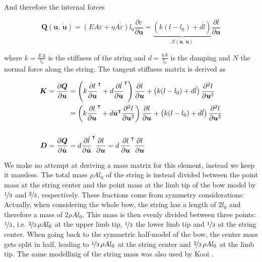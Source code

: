 And therefore the internal forces

\begin{equation}
\boldsymbol{Q}(\boldsymbol{u},\,\dot{\boldsymbol{u}}) = \left(EA\varepsilon + \eta A\dot{\varepsilon}\right)l_{0}\frac{\partial\varepsilon}{\partial\boldsymbol{u}} = \underbrace{\left(k(l - l_{0}) + d\dot{l}\right)}_{N(\boldsymbol{u},\,\dot{\boldsymbol{u}})}\frac{\partial l}{\partial\boldsymbol{u}}
\end{equation}

where $k = \frac{EA}{l_{0}}$ is the stiffness of the string and $d = \frac{\eta A}{l_{0}}$ is the damping and $N$ the normal force along the string.
The tangent stiffness matrix is derived as

\begin{align}
\boldsymbol{K} = \frac{\partial\boldsymbol{Q}}{\partial\boldsymbol{u}} &= \left(k\frac{\partial l}{\partial\boldsymbol{u}}^\intercal + d\frac{\partial\dot{l}}{\partial\boldsymbol{u}}^\intercal\right)\frac{\partial l}{\partial\boldsymbol{u}} + \left(k(l - l_{0}) + d\dot{l}\right)\frac{\partial^2 l}{\partial\boldsymbol{u}^2} \notag \\
&= \left(k\frac{\partial l}{\partial\boldsymbol{u}}^\intercal + d\dot{\boldsymbol{u}}^\intercal\frac{\partial^2 l}{\partial\boldsymbol{u}^2}\right)\frac{\partial l}{\partial\boldsymbol{u}} + \left(k(l - l_{0}) + d\dot{l}\right)\frac{\partial^2 l}{\partial\boldsymbol{u}^2} \\
\notag \\
\boldsymbol{D} = \frac{\partial\boldsymbol{Q}}{\partial\dot{\boldsymbol{u}}} &= d\frac{\partial\dot{l}}{\partial\dot{\boldsymbol{u}}}^\intercal\frac{\partial l}{\partial\boldsymbol{u}} = d\,\frac{\partial l}{\partial\boldsymbol{u}}^\intercal\frac{\partial l}{\partial\boldsymbol{u}}
\end{align}

We make no attempt at deriving a mass matrix for this element, instead we keep it massless.
The total mass $\rho A l_{0}$ of the string is instead divided between the point mass at the string center and the point mass at the limb tip of the bow model by $\nicefrac{1}{3}$ and $\nicefrac{2}{3}$, respectively.
These fractions come from symmetry considerations: Actually, when considering the whole bow, the string has a length of $2l_{0}$ and therefore a mass of $2\rho A l_{0}$.
This mass is then evenly divided between three points: $\nicefrac{1}{3}$, i.e. $\nicefrac{2}{3}\,\rho A l_{0}$ at the upper limb tip, $\nicefrac{1}{3}$ the lower limb tip and $\nicefrac{1}{3}$ at the string center.
When going back to the symmetric half-model of the bow, the center mass gets split in half, leading to $\nicefrac{1}{3}\,\rho A l_{0}$ at the string center and $\nicefrac{2}{3}\,\rho A l_{0}$ at the limb tip.
The same modellinig of the string mass was also used by Kooi \cite{bib:kooi81}.


